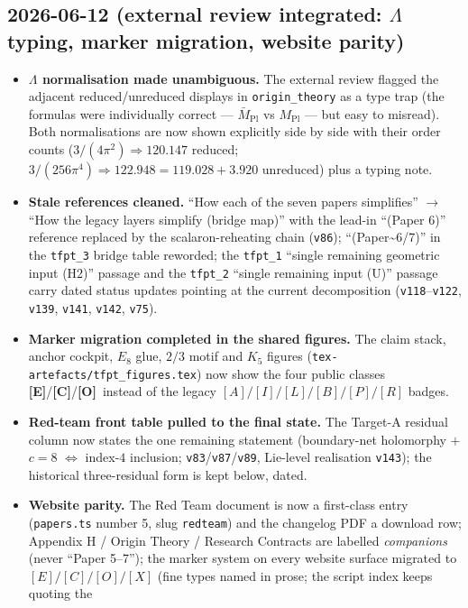 \documentclass[11pt]{article}
\providecommand{\mE}{\textbf{[E]}}\providecommand{\mC}{\textbf{[C]}}
\providecommand{\mO}{\textbf{[O]}}\providecommand{\mX}{\textbf{[X]}}
\providecommand{\vref}[1]{\texttt{#1}}
\begin{document}
\subsection*{2026-06-12 (external review integrated: $\Lambda$ typing, marker migration, website parity)}
\begin{itemize}
\item \textbf{$\Lambda$ normalisation made unambiguous.} The external review flagged the
  adjacent reduced/unreduced displays in \texttt{origin\_theory} as a type trap (the
  formulas were individually correct --- $\bar M_{\mathrm{Pl}}$ vs $M_{\mathrm{Pl}}$ ---
  but easy to misread). Both normalisations are now shown explicitly side by side with
  their order counts ($3/(4\pi^2)\Rightarrow120.147$ reduced;
  $3/(256\pi^4)\Rightarrow122.948=119.028+3.920$ unreduced) plus a typing note.
\item \textbf{Stale references cleaned.} ``How each of the seven papers simplifies''
  $\to$ ``How the legacy layers simplify (bridge map)'' with the lead-in ``(Paper 6)''
  reference replaced by the scalaron-reheating chain (\vref{v86});
  ``(Paper\textasciitilde6/7)'' in the \texttt{tfpt\_3} bridge table reworded; the
  \texttt{tfpt\_1} ``single remaining geometric input (H2)'' passage and the
  \texttt{tfpt\_2} ``single remaining input (U)'' passage carry dated status updates
  pointing at the current decomposition (\vref{v118}--\vref{v122}, \vref{v139},
  \vref{v141}, \vref{v142}, \vref{v75}).
\item \textbf{Marker migration completed in the shared figures.} The claim stack,
  anchor cockpit, $E_8$ glue, $2/3$ motif and $K_5$ figures
  (\texttt{tex-artefacts/tfpt\_figures.tex}) now show the four public classes
  \mE/\mC/\mO\ instead of the legacy $[A]/[I]/[L]/[B]/[P]/[R]$ badges.
\item \textbf{Red-team front table pulled to the final state.} The Target-A residual
  column now states the one remaining statement (boundary-net holomorphy $+$ $c{=}8$
  $\Leftrightarrow$ index-$4$ inclusion; \vref{v83}/\vref{v87}/\vref{v89}, Lie-level
  realisation \vref{v143}); the historical three-residual form is kept below, dated.
\item \textbf{Website parity.} The Red Team document is now a first-class entry
  (\texttt{papers.ts} number 5, slug \texttt{redteam}) and the changelog PDF a download
  row; Appendix H / Origin Theory / Research Contracts are labelled \emph{companions}
  (never ``Paper 5--7''); the marker system on every website surface migrated to
  $[E]/[C]/[O]/[X]$ (fine types named in prose; the script index keeps quoting the

\end{itemize}
\end{document}
